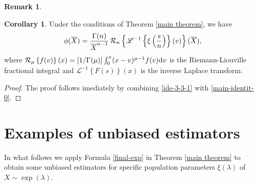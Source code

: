\documentclass[12pt]{article}
\theoremstyle{definition}
\newtheorem{corollary}[theorem]{Corollary}
\newtheorem{remark}[theorem]{Remark}
\begin{document}
\begin{remark}
{%
}
	\end{remark}





\begin{corollary}
	Under the conditions of Theorem \ref{main theorem}, we have 
	\begin{align*}
		\phi(\overline{X})
		=
		{\Gamma(n)\over \overline{X}^{n-1}}\,
		\mathcal{R}_n\left\{\mathscr{L}^{-1}\left\{\xi\left({s\over n}\right)
		\right\}(v)\right\}(\overline{X}),
	\end{align*}
	where $\mathcal{R}_\mu\left\{f(v)\right\}(x)=[1/\Gamma(\mu)]\int_0^x (x-v)^{\mu-1}f(v){\rm d}v$ is the Riemann-Liouville fractional integral and $\mathscr{L}^{-1}\left\{F(s)\right\}(x)$ is the inverse Laplace  transform.
\end{corollary}
\begin{proof}
	The proof follows imediately by combining \eqref{ide-3-3-1} with \eqref{main-identit-0}.
\end{proof}






\section{Examples of unbiased estimators} 


In what follows we apply Formula \eqref{final-exp} in Theorem \ref{main theorem} to obtain some unbiased estimators for specific population parameters $\xi(\lambda)$ of $X\sim\exp(\lambda)$.
\end{document}
